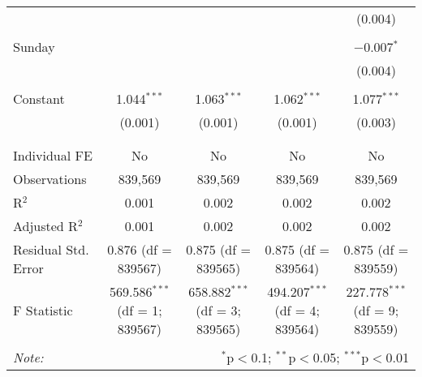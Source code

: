 \documentclass[
]{article}
\begin{document}
\begin{table}[!htbp]
{\begin{tabular}{@{\extracolsep{5pt}}lcccc}
  &  &  &  & (0.004) \\ 
  & & & & \\ 
 Sunday &  &  &  & $-$0.007$^{*}$ \\ 
  &  &  &  & (0.004) \\ 
  & & & & \\ 
 Constant & 1.044$^{***}$ & 1.063$^{***}$ & 1.062$^{***}$ & 1.077$^{***}$ \\ 
  & (0.001) & (0.001) & (0.001) & (0.003) \\ 
  & & & & \\ 
\hline \\[-1.8ex] 
Individual FE & No & No & No & No \\ 
Observations & 839,569 & 839,569 & 839,569 & 839,569 \\ 
R$^{2}$ & 0.001 & 0.002 & 0.002 & 0.002 \\ 
Adjusted R$^{2}$ & 0.001 & 0.002 & 0.002 & 0.002 \\ 
Residual Std. Error & 0.876 (df = 839567) & 0.875 (df = 839565) & 0.875 (df = 839564) & 0.875 (df = 839559) \\ 
F Statistic & 569.586$^{***}$ (df = 1; 839567) & 658.882$^{***}$ (df = 3; 839565) & 494.207$^{***}$ (df = 4; 839564) & 227.778$^{***}$ (df = 9; 839559) \\ 
\hline 
\hline \\[-1.8ex] 
\textit{Note:}  & \multicolumn{4}{r}{$^{*}$p$<$0.1; $^{**}$p$<$0.05; $^{***}$p$<$0.01} \\ 
\end{tabular}
} 
\end{table} 
\newpage
\end{document}
